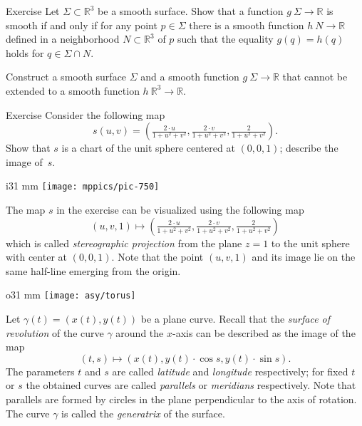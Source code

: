 \begin{thm}{Exercise}\label{ex:smooth-fun(surf)}
Let $\Sigma\subset \mathbb{R}^3$ be a smooth surface.
Show that a function $g\:\Sigma\to\mathbb{R}$ is smooth if and only if for any point $p\in \Sigma$ there is a smooth function $h\:N\to\mathbb{R}$ defined in a neighborhood $N\subset \mathbb{R}^3$ of $p$ such that the equality $g(q)=h(q)$ holds for $q\in \Sigma\cap N$.

Construct a smooth surface $\Sigma$ and a smooth function $g\:\Sigma\to\mathbb{R}$ that cannot be extended to a smooth function $h\:\mathbb{R}^3\to\mathbb{R}$.
\end{thm}


\begin{thm}{Exercise}\label{ex:inversion-chart}
Consider the following map 
\[s(u,v)=(\tfrac{2\cdot u}{1+u^2+v^2},\tfrac{2\cdot v}{1+u^2+v^2},\tfrac{2}{1+u^2+v^2}).\]
Show that $s$ is a chart of the unit sphere centered at $(0,0,1)$; describe the image of~$s$.
\end{thm}

\begin{wrapfigure}{i}{31 mm}
\vskip-6mm
\centering
\texttt{[image: mppics/pic-750]}
\vskip0mm
\end{wrapfigure}

The map $s$ in the exercise can be visualized using the following map
\[(u,v,1)\mapsto (\tfrac{2\cdot u}{1+u^2+v^2},\tfrac{2\cdot v}{1+u^2+v^2},\tfrac{2}{1+u^2+v^2})\]
which is called \emph{stereographic projection} from the plane $z=1$ to the unit sphere with center at $(0,0,1)$.
Note that the point $(u,v,1)$ and its image lie on the same half-line emerging from the origin. 

\begin{wrapfigure}{o}{31 mm}
\vskip-3mm
\centering
\texttt{[image: asy/torus]}
\vskip0mm
\end{wrapfigure}

Let $\gamma(t)=(x(t),y(t))$ be a plane curve.
Recall that the \emph{surface of revolution} of the curve $\gamma$ around the $x$-axis can be described as the 
image of the map 
\[(t, s)\mapsto (x(t), y(t)\cdot\cos s,y(t)\cdot\sin s).\]
The parameters $t$ and $s$ are called \emph{latitude} and \emph{longitude} respectively;
for fixed $t$ or $s$ the obtained curves are called \emph{parallels} or
\emph{meridians} respectively. 
Note that parallels are formed by circles in the plane perpendicular to the axis of rotation.
The curve $\gamma$ is called the \emph{generatrix} of the surface.

